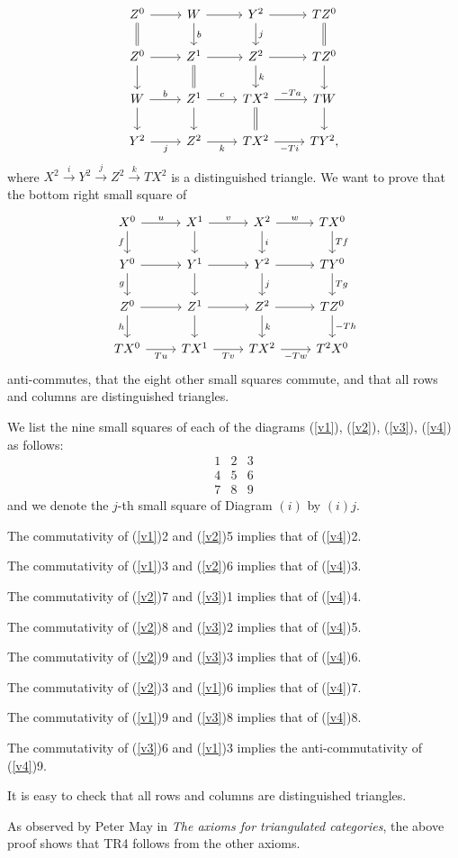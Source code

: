 \documentclass[12pt]{article}
\theoremstyle{remark}%
\begin{document}
%
\begin{equation}\label{v3}
\begin{tikzcd}
Z^0\ar{r}\ar[equal]{d}&W\ar{d}{b}\ar{r}&Y^2\ar{d}{j}\ar{r}&TZ^0\ar[equal]{d}\\
Z^0\ar{d}\ar{r}&Z^1\ar{r}\ar[equal]{d}&Z^2\ar{d}{k}\ar{r}&TZ^0\ar{d}\\
W\ar{d}\ar{r}{b}&Z^1\ar{d}\ar{r}{c}&TX^2\ar{r}{-Ta}\ar[equal]{d}&TW\ar{d}\\
Y^2\ar{r}[swap]{j}&Z^2\ar{r}[swap]{k}&TX^2\ar{r}[swap]{-Ti}&TY^2,
\end{tikzcd}
\end{equation}
%
where $X^2\overset{i}{\to}Y^2\overset{j}{\to}Z^2\overset{k}{\to}TX^2$ is a distinguished triangle. We want to prove that the bottom right small square of 
%
\begin{equation}\label{v4}
\begin{tikzcd}
X^0\ar{r}{u}\ar{d}[swap]{f}&X^1\ar{d}\ar{r}{v}&X^2\ar{d}{i}\ar{r}{w}&TX^0\ar{d}{Tf}\\ 
Y^0\ar{r}\ar{d}[swap]{g}&Y^1\ar{d}\ar{r}&Y^2\ar{d}{j}\ar{r}&TY^0\ar{d}{Tg}\\ 
Z^0\ar{r}\ar{d}[swap]{h}&Z^1\ar{d}\ar{r}&Z^2\ar{d}{k}\ar{r}&TZ^0\ar{d}{-Th}\\ 
TX^0\ar{r}[swap]{Tu}&TX^1\ar{r}[swap]{Tv}&TX^2\ar{r}[swap]{-Tw}&T^2X^0
\end{tikzcd}
\end{equation}
%
anti-commutes, that the eight other small squares commute, and that all rows and columns are distinguished triangles.

We list the nine small squares of each of the diagrams (\ref{v1}), (\ref{v2}), (\ref{v3}), (\ref{v4}) as follows:
$$
\begin{matrix}1&2&3\\ 4&5&6\\ 7&8&9
\end{matrix}
$$ 
and we denote the $j$-th small square of Diagram $(i)$ by $(i)j$. 

The commutativity of (\ref{v1})2 and (\ref{v2})5 implies that of (\ref{v4})2. 

The commutativity of (\ref{v1})3 and (\ref{v2})6 implies that of (\ref{v4})3.

The commutativity of (\ref{v2})7 and (\ref{v3})1 implies that of (\ref{v4})4.

The commutativity of (\ref{v2})8 and (\ref{v3})2 implies that of (\ref{v4})5. 

The commutativity of (\ref{v2})9 and (\ref{v3})3 implies that of (\ref{v4})6. 

The commutativity of (\ref{v2})3 and (\ref{v1})6 implies that of (\ref{v4})7. 

The commutativity of (\ref{v1})9 and (\ref{v3})8 implies that of (\ref{v4})8. 

The commutativity of (\ref{v3})6 and (\ref{v1})3 implies the anti-commutativity of (\ref{v4})9. 

It is easy to check that all rows and columns are distinguished triangles.

As observed by Peter May in \emph{The axioms for triangulated categories}, the above proof shows that TR4 follows from the other axioms.
%
%
\end{document}
